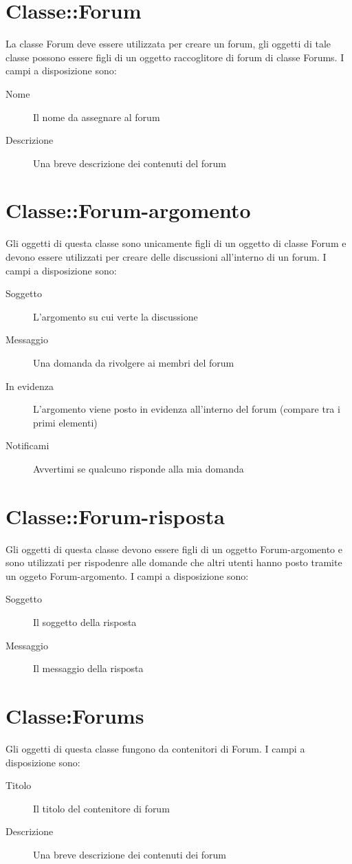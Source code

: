 \section{Classe::Forum}
La classe Forum deve essere utilizzata per creare un forum, gli oggetti di tale classe possono essere figli di un oggetto raccoglitore di forum di classe Forums. I campi a disposizione sono:
\begin{description}
\item[Nome] Il nome da assegnare al forum
\item[Descrizione] Una breve descrizione dei contenuti del forum
\end{description}

\section{Classe::Forum-argomento}
Gli oggetti di questa classe sono unicamente figli di un oggetto di classe Forum e devono essere utilizzati per creare delle discussioni all'interno  di un forum.
I campi a disposizione sono:
\begin{description}
 \item[Soggetto]L'argomento su cui verte la discussione
\item[Messaggio]Una domanda da rivolgere ai membri del forum
\item[In evidenza]L'argomento viene posto in evidenza all'interno del forum (compare tra i primi elementi)
\item[Notificami] Avvertimi se qualcuno risponde alla mia domanda
\end{description}

\section{Classe::Forum-risposta}
Gli oggetti di questa classe devono essere figli di un oggetto Forum-argomento e sono utilizzati per rispodenre alle domande che altri utenti hanno posto tramite un oggeto Forum-argomento. I campi a disposizione sono:
\begin{description}
 \item[Soggetto]Il soggetto della risposta
\item[Messaggio]Il messaggio della risposta
\end{description}

\section{Classe:Forums}
Gli oggetti di questa classe fungono da contenitori di Forum. I campi a disposizione sono:
\begin{description}
\item[Titolo]Il titolo del contenitore di forum
\item[Descrizione] Una breve descrizione dei contenuti dei forum
\end{description}

